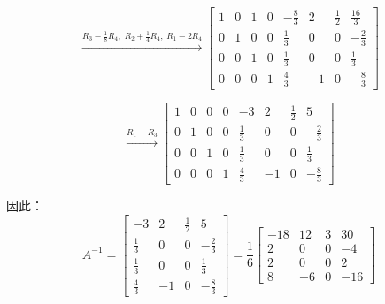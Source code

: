 \documentclass[12pt,a4paper]{article}
\begin{document}
	$$\xrightarrow{R_3-\frac{1}{8}R_4,\;R_2+\frac{1}{4}R_4,\;R_1-2R_4}
	\left[\begin{array}{cccc|cccc}
	1&0&1&0 & -\frac{8}{3}&2&\frac{1}{2}&\frac{16}{3}\\
	0&1&0&0 & \frac{1}{3}&0&0&-\frac{2}{3}\\
	0&0&1&0 & \frac{1}{3}&0&0&\frac{1}{3}\\
	0&0&0&1 & \frac{4}{3}&-1&0&-\frac{8}{3}
	\end{array}\right]$$
	
	$$\xrightarrow{R_1-R_3}
	\left[\begin{array}{cccc|cccc}
	1&0&0&0 & -3&2&\frac{1}{2}&5\\
	0&1&0&0 & \frac{1}{3}&0&0&-\frac{2}{3}\\
	0&0&1&0 & \frac{1}{3}&0&0&\frac{1}{3}\\
	0&0&0&1 & \frac{4}{3}&-1&0&-\frac{8}{3}
	\end{array}\right]$$
	
	因此：
	$$A^{-1} = \begin{bmatrix} -3 & 2 & \frac{1}{2} & 5 \\ \frac{1}{3} & 0 & 0 & -\frac{2}{3} \\ \frac{1}{3} & 0 & 0 & \frac{1}{3} \\ \frac{4}{3} & -1 & 0 & -\frac{8}{3} \end{bmatrix} = \frac{1}{6}\begin{bmatrix} -18 & 12 & 3 & 30 \\ 2 & 0 & 0 & -4 \\ 2 & 0 & 0 & 2 \\ 8 & -6 & 0 & -16 \end{bmatrix}$$
	
	
\end{document}
